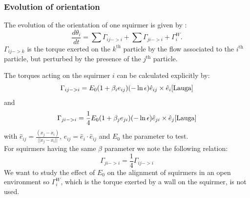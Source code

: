 \documentclass{article}
\begin{document}
\subsubsection{Evolution of orientation}
The evolution of the orientation of one squirmer is given by : 
$$
\frac{d \theta_i}{dt} = \sum \Gamma_{ij->i} + \sum \Gamma_{ji->i} +  \Gamma_{i}^W.
$$
$\Gamma_{ij->k}$ is the torque exerted on the $k^\mathrm{th}$ particle by the flow associated to the $i^\mathrm{th}$ particle, but perturbed by the presence of the $j^\mathrm{th}$ particle.\\

\vspace{0.5cm}

The torques acting on the squirmer $i$ can be calculated explicitly by: \\
$$
\Gamma_{ij->i} = E_0(1 + \beta_i e_{ij})(-\ln\epsilon)\hat{e}_{ij}\times \hat{e}_i \cite{Lauga}
$$
and
$$
\Gamma_{ji->i} = \frac{1}{4}E_0(1 + \beta_j e_{ji})(-\ln\epsilon)\hat{e}_{ji}\times \hat{e}_j \cite{Lauga}
$$
with $\hat{e}_{ij} = \frac{(x_j - x_i)}{||x_j - x_i||}$, $e_{ij} = \hat{e}_i\cdot \hat{e}_{ij}$ and $E_0$ the parameter to test.\\ 
For squirmers having the same $\beta$ parameter we note the following relation:
$$
\Gamma_{ji->i} = \frac{1}{4}\Gamma_{ij->i}
$$
We want to study the effect of $E_0$ on the alignment of squirmers in an open environment so $\Gamma_{i}^W$, which is the torque 
exerted by a wall on the squirmer, is not used.
\end{document}
